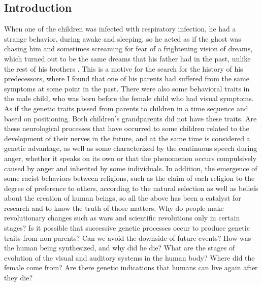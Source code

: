 \begin{Summary}
\section{Introduction}
When one of the children was infected with respiratory infection, he had a strange behavior, during awake and sleeping, so he acted as if the ghost was chasing him and sometimes screaming for fear of a frightening vision of dreams, which turned out to be the same dreams that his father had in the past, unlike the rest of his brothers . This is a motive for the search for the history of his predecessors, where I found that one of his parents had suffered from the same symptoms at some point in the past. There were also some behavioral traits in the male child, who was born before the female child who had visual symptoms. As if the genetic traits passed from parents to children in a time sequence and based on positioning. Both children's grandparents did not have these traits. Are these neurological processes that have occurred to some children related to the development of their nerves in the future, and at the same time is considered a genetic advantage, as well as some characterized by the continuous speech during anger, whether it speaks on its own or that the phenomenon occurs compulsively caused by anger and inherited by some individuals. In addition, the emergence of some racist behaviors between religions, such as the claim of each religion to the degree of preference to others, according to the natural selection as well as beliefs about the creation of human beings, so all the above has been a catalyst for research and to know the truth of those matters.
Why do people make revolutionary changes such as wars and scientific revolutions only in certain stages?
Is it possible that successive genetic processes occur to produce genetic traits from non-parents?
Can we avoid the downside of future events?
How was the human being synthesized, and why did he die?
What are the stages of evolution of the visual and auditory systems in the human body?
Where did the female come from?
Are there genetic indications that humans can live again after they die?
 

\end{Summary}

